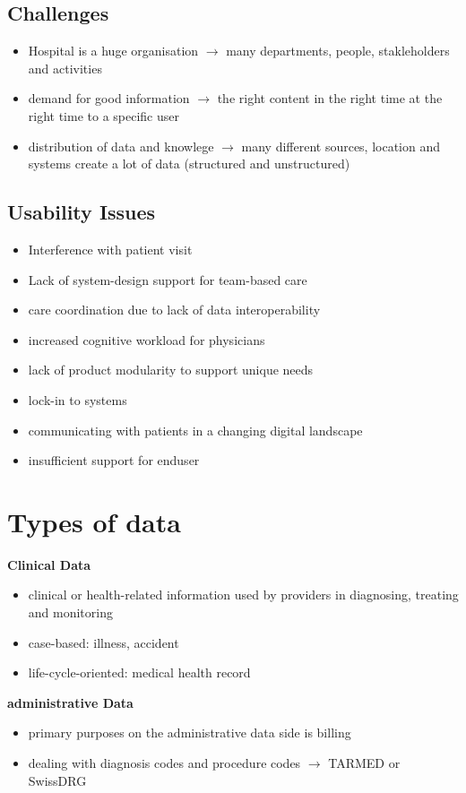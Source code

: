 \documentclass{report}
\theoremstyle{definition}
\theoremstyle{example}
\begin{document}
\subsection{Challenges}
\begin{itemize}
   \item Hospital is a huge organisation $\rightarrow$ many departments, people, stakleholders and activities
   \item demand for good information $\rightarrow$ the right content in the right time at the right time to a specific user
   \item distribution of data and knowlege $\rightarrow$ many different sources, location and systems create a lot of data (structured and unstructured)
\end{itemize}

\subsection{Usability Issues}
\begin{itemize}
   \item Interference with patient visit
   \item Lack of system-design support for team-based care
   \item care coordination due to lack of data interoperability
   \item increased cognitive workload for physicians
   \item lack of product modularity to support unique needs
   \item lock-in to systems
   \item communicating with patients in a changing digital landscape
   \item insufficient support for enduser
\end{itemize}


\section{Types of data}
\textbf{Clinical Data}
\begin{itemize}
   \item clinical or health-related information used by providers in diagnosing, treating and monitoring
   \item case-based: illness, accident
   \item life-cycle-oriented: medical health record
\end{itemize}

\textbf{administrative Data}
\begin{itemize}
   \item primary purposes on the administrative data side is billing
   \item dealing with diagnosis codes and procedure codes $\rightarrow$ TARMED or SwissDRG
\end{itemize}
\end{document}
